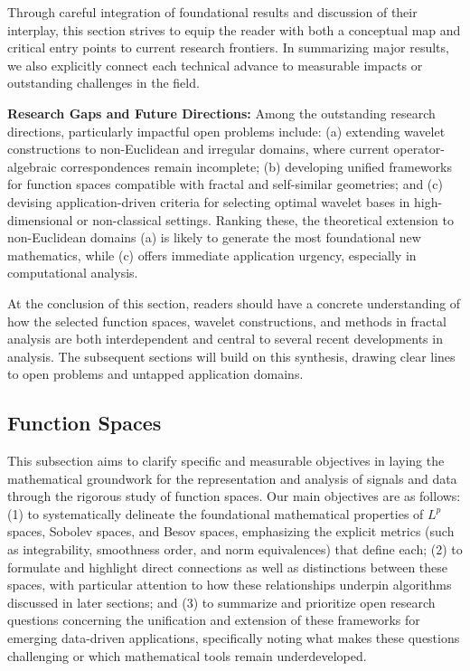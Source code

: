 \documentclass[sigconf]{acmart}
\begin{document}
Through careful integration of foundational results and discussion of their interplay, this section strives to equip the reader with both a conceptual map and critical entry points to current research frontiers. In summarizing major results, we also explicitly connect each technical advance to measurable impacts or outstanding challenges in the field.

\textbf{Research Gaps and Future Directions:} Among the outstanding research directions, particularly impactful open problems include: (a) extending wavelet constructions to non-Euclidean and irregular domains, where current operator-algebraic correspondences remain incomplete; (b) developing unified frameworks for function spaces compatible with fractal and self-similar geometries; and (c) devising application-driven criteria for selecting optimal wavelet bases in high-dimensional or non-classical settings. Ranking these, the theoretical extension to non-Euclidean domains (a) is likely to generate the most foundational new mathematics, while (c) offers immediate application urgency, especially in computational analysis.

At the conclusion of this section, readers should have a concrete understanding of how the selected function spaces, wavelet constructions, and methods in fractal analysis are both interdependent and central to several recent developments in analysis. The subsequent sections will build on this synthesis, drawing clear lines to open problems and untapped application domains.

\subsection{Function Spaces}

This subsection aims to clarify specific and measurable objectives in laying the mathematical groundwork for the representation and analysis of signals and data through the rigorous study of function spaces. Our main objectives are as follows: (1) to systematically delineate the foundational mathematical properties of $L^p$ spaces, Sobolev spaces, and Besov spaces, emphasizing the explicit metrics (such as integrability, smoothness order, and norm equivalences) that define each; (2) to formulate and highlight direct connections as well as distinctions between these spaces, with particular attention to how these relationships underpin algorithms discussed in later sections; and (3) to summarize and prioritize open research questions concerning the unification and extension of these frameworks for emerging data-driven applications, specifically noting what makes these questions challenging or which mathematical tools remain underdeveloped.
\end{document}
